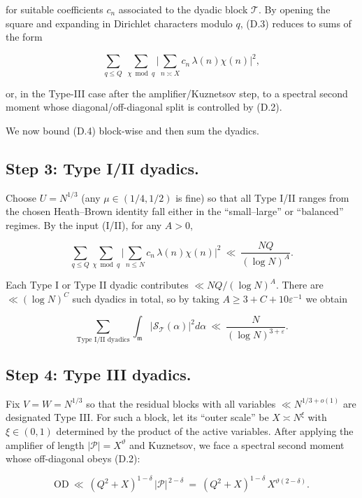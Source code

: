 \documentclass[11pt]{article}
\theoremstyle{definition}
\theoremstyle{remark}
\begin{document}
for suitable coefficients $c_n$ associated to the dyadic block $\mathcal T$. By opening the square and expanding in Dirichlet characters modulo $q$, (D.3) reduces to sums of the form

\begin{equation}
\sum_{q\le Q}\ \sum_{\chi\bmod q}
\Big|\sum_{n\asymp X} c_n\,\lambda(n)\chi(n)\Big|^2,
\tag{D.4}
\end{equation}

or, in the Type-III case after the amplifier/Kuznetsov step, to a spectral second moment whose diagonal/off-diagonal split is controlled by (D.2).

We now bound (D.4) block-wise and then sum the dyadics.


\subsection*{Step 3: Type I/II dyadics.}
Choose $U=N^{1/3}$ (any $\mu\in(1/4,1/2)$ is fine) so that all Type I/II ranges from the chosen Heath–Brown identity fall either in the “small–large” or “balanced” regimes. By the input (I/II), for any $A>0$,

$$
\sum_{q\le Q}\sum_{\chi\bmod q}
\Big|\sum_{n\le N} c_n\,\lambda(n)\chi(n)\Big|^2
\ \ll\ \frac{NQ}{(\log N)^A}.
$$

Each Type I or Type II dyadic contributes $\ll NQ/(\log N)^A$. There are $\ll(\log N)^C$ such dyadics in total, so by taking $A\ge 3+C+10\varepsilon^{-1}$ we obtain

\begin{equation}
\sum_{\text{Type I/II dyadics}}
\int_{\mathfrak m}\big|\mathcal S_{\mathcal T}(\alpha)\big|^2 d\alpha
\ \ll\ \frac{N}{(\log N)^{3+\varepsilon}}.
\tag{D.5}
\end{equation}

\subsection*{Step 4: Type III dyadics.}
Fix $V=W=N^{1/3}$ so that the residual blocks with all variables $\ll N^{1/3+o(1)}$ are designated Type III. For such a block, let its “outer scale” be $X\asymp N^\xi$ with $\xi\in(0,1)$ determined by the product of the active variables. After applying the amplifier of length $|\mathcal P|=X^\vartheta$ and Kuznetsov, we face a spectral second moment whose off-diagonal obeys (D.2):

$$
\mathrm{OD}\ \ll\ (Q^2+X)^{1-\delta}\,|\mathcal P|^{\,2-\delta}
\ =\ (Q^2+X)^{1-\delta}\,X^{\vartheta(2-\delta)}.
$$
\end{document}
